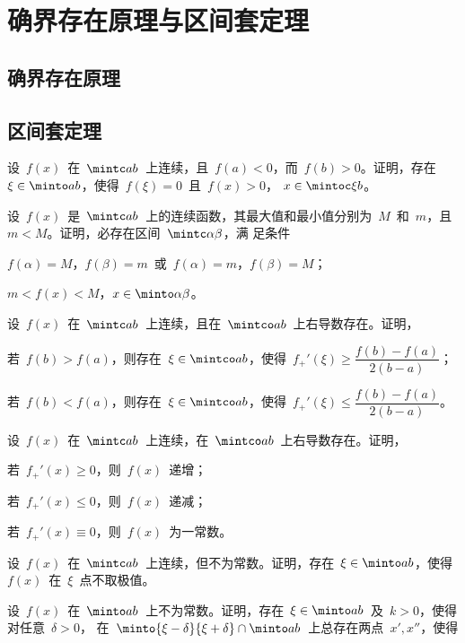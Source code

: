 \section{确界存在原理与区间套定理}
\subsection{确界存在原理}
\subsection{区间套定理}
\begin{exercise}
\item 设~$f(x)$~在~$\mintc ab$~上连续，且~$f(a)<0$，而~$f(b)>0$。证明，存在~$\xi\in\minto ab$，使得~$f(\xi)=0$~且~$f(x)>0$，%
$x\in\mintoc \xi b$。
\item 设~$f(x)$~是~$\mintc ab$~上的连续函数，其最大值和最小值分别为~$M$~和~$m$，且~$m<M$。证明，必存在区间~$\mintc\alpha\beta$，满
足条件
\begin{exlist}
  \item $f(\alpha)=M$，$f(\beta)=m$~或~$f(\alpha)=m$，$f(\beta)=M$；
  \item $m<f(x)<M$，$x\in\minto\alpha\beta$。
\end{exlist}
\item 设~$f(x)$~在~$\mintc ab$~上连续，且在~$\mintco ab$~上右导数存在。证明，
\begin{exlist}
  \item 若~$f(b)>f(a)$，则存在~$\xi\in\mintco ab$，使得~$f_+'(\xi)\geq\dfrac{f(b)-f(a)}{2(b-a)}$；
  \item 若~$f(b)<f(a)$，则存在~$\xi\in\mintco ab$，使得~$f_+'(\xi)\leq\dfrac{f(b)-f(a)}{2(b-a)}$。
\end{exlist}
\item 设~$f(x)$~在~$\mintc ab$~上连续，在~$\mintco ab$~上右导数存在。证明，
\begin{exlistcols}
  \item 若~$f_+'(x)\geq0$，则~$f(x)$~递增；
  \item 若~$f_+'(x)\leq0$，则~$f(x)$~递减；
  \item 若~$f_+'(x)\equiv0$，则~$f(x)$~为一常数。
\end{exlistcols}
\item 设~$f(x)$~在~$\mintc ab$~上连续，但不为常数。证明，存在~$\xi\in\minto ab$，使得~$f(x)$~在~$\xi$~点不取极值。
\item 设~$f(x)$~在~$\minto ab$~上不为常数。证明，存在~$\xi\in\minto ab$~及~$k>0$，使得对任意~$\delta>0$，%
在~$\minto{\xi-\delta}{\xi+\delta}\cap\minto ab$~上总存在两点~$x',x''$，使得

\end{exercise}
